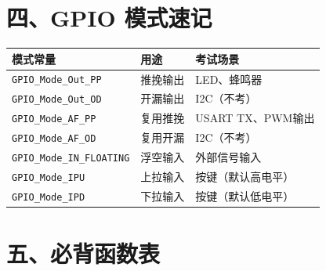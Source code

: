 \documentclass[10pt,a4paper,oneside]{ctexart}
\newcommand{\keyword}[1]{\textcolor{mainblue}{\texttt{#1}}}
\begin{document}
\section*{四、GPIO 模式速记}

\begin{center}
\begin{tabular}{@{}lll@{}}
    \toprule
    \textbf{模式常量} & \textbf{用途} & \textbf{考试场景} \\
    \midrule
    \keyword{GPIO\_Mode\_Out\_PP} & 推挽输出 & LED、蜂鸣器 \\
    \keyword{GPIO\_Mode\_Out\_OD} & 开漏输出 & I2C（不考） \\
    \keyword{GPIO\_Mode\_AF\_PP}  & 复用推挽 & USART TX、PWM输出 \\
    \keyword{GPIO\_Mode\_AF\_OD}  & 复用开漏 & I2C（不考） \\
    \keyword{GPIO\_Mode\_IN\_FLOATING} & 浮空输入 & 外部信号输入 \\
    \keyword{GPIO\_Mode\_IPU}     & 上拉输入 & 按键（默认高电平） \\
    \keyword{GPIO\_Mode\_IPD}     & 下拉输入 & 按键（默认低电平） \\
    \bottomrule
\end{tabular}
\end{center}

\section*{五、必背函数表}
\end{document}
